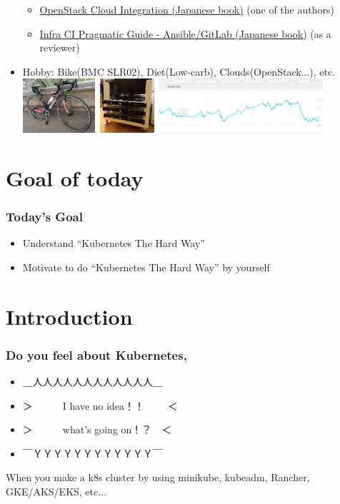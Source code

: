 \documentclass[aspectratio=169,11pt,hyperref={colorlinks=true}]{beamer}
\begin{document}
\begin{frame}
\begin{itemize}
      \begin{itemize}
      \item \href{https://www.amazon.co.jp/dp/4798139785/}{\scriptsize{OpenStack
        Cloud Integration (Japanese book)}} (one of the authors)
      \item \href{https://www.amazon.co.jp/dp/4798155128/}{\scriptsize{Infra CI
        Pragmatic Guide - Ansible/GitLab (Japanese book)}} (as a reviewer)
      \end{itemize}
    \item Hobby: Bike(BMC SLR02), Diet(Low-carb), Clouds(OpenStack...), etc.
    \includegraphics[height=20mm]{images/my-bike.jpg}~\includegraphics[height=20mm]{images/server_front.jpg}~\includegraphics[height=20mm]{images/my-weight.png}
  \end{itemize}
\end{frame}

\section{Goal of today}
\begin{frame}
  \frametitle{Today's Goal}
  \begin{itemize}
    \item Understand ``Kubernetes The Hard Way''
    \item Motivate to do ``Kubernetes The Hard Way'' by yourself
  \end{itemize}
\end{frame}

\section{Introduction}
\begin{frame}
  \frametitle{Do you feel about Kubernetes,}
  \begin{itemize}
    \item[] \Huge{＿人人人人人人人人人人人人＿}
    \item[] \Huge{＞　　　I have no idea！！ 　　＜}
    \item[] \Huge{＞　　　what's going on！？　＜}
    \item[] \Huge{￣ＹＹＹＹＹＹＹＹＹＹＹＹ￣}
  \end{itemize}
  When you make a k8s cluster by using minikube, kubeadm, Rancher, GKE/AKS/EKS, etc...
\end{frame}
\end{document}
